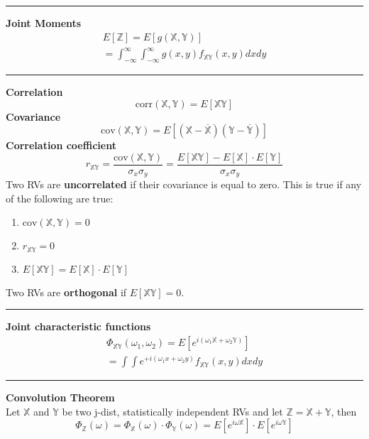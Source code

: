 \documentclass{article}
\providecommand{\X}{\mathbb{X}}
\providecommand{\Y}{\mathbb{Y}}
\providecommand{\Z}{\mathbb{Z}}
\begin{document}
\begin{multicols*}{3}
        \noindent\rule{\columnwidth}{0.4pt}

        \textbf{Joint Moments}
        \begin{equation*}
            \begin{gathered}
                E[\Z] = E[g(\X,\Y)]\\
                = \int_{-\infty}^{\infty} \int_{-\infty}^{\infty}  g(x,y)f_{\X\Y}(x,y)dxdy
            \end{gathered}
        \end{equation*}

        \noindent\rule{\columnwidth}{0.4pt}

        \textbf{Correlation}
        \begin{equation*}
            \text{corr}(\X,\Y)=E[\X\Y]
        \end{equation*}
        \textbf{Covariance}
        \begin{equation*}
            \text{cov}(\X,\Y)=E[(\X-\overline{\X})(\Y-\overline{\Y})]
        \end{equation*}
        \textbf{Correlation coefficient}
        \begin{equation*}
            r_{\X\Y} = \frac{\text{cov}(\X,\Y)}{\sigma_x \sigma_y} = \frac{E[\X\Y]-E[\X]\cdot E[\Y]}{\sigma_x\sigma_y}
        \end{equation*}
        Two RVs are \textbf{uncorrelated} if their covariance is equal to zero.
        This is true if any of the following are true:
        \begin{enumerate}
            \item $\text{cov}(\X,\Y) = 0$
            \item $r_{\X\Y}=0$
            \item $E[\X\Y] = E[\X] \cdot E[\Y]$
        \end{enumerate}
        Two RVs are \textbf{orthogonal} if $E[\X\Y] = 0$.

        \noindent\rule{\columnwidth}{0.4pt}

        \textbf{Joint characteristic functions}
        \begin{equation*}
            \begin{gathered}
                \Phi_{\X\Y}(\omega_1,\omega_2) = E[e^{i(\omega_1\X+\omega_2\Y)}]\\
                = \int \int e^{+i(\omega_1 x+\omega_2 y)}f_{\X\Y}(x,y)dxdy
            \end{gathered}
        \end{equation*}

        \noindent\rule{\columnwidth}{0.4pt}

        \textbf{Convolution Theorem}\\
        Let $\X$ and $\Y$ be two j-dist, statistically independent RVs and let $\Z=\X+\Y$, then
        \begin{equation*}
            \Phi_{\Z}(\omega) = \Phi_{\X}(\omega)\cdot\Phi_{\Y}(\omega) = E[e^{i\omega\X}]\cdot E[e^{i\omega\Y}]
        \end{equation*}

    \end{multicols*}
\end{document}
